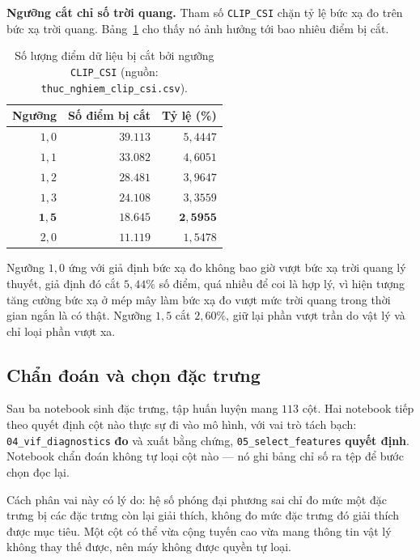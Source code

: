 \textbf{Ngưỡng cắt chỉ số trời quang.} Tham số \texttt{CLIP\_CSI} chặn tỷ lệ bức xạ đo trên bức xạ
trời quang. Bảng~\ref{tab:clip_csi} cho thấy nó ảnh hưởng tới bao nhiêu điểm bị cắt.

\begin{table}[htbp]
\centering
\caption{Số lượng điểm dữ liệu bị cắt bởi ngưỡng \texttt{CLIP\_CSI} (nguồn: \texttt{thuc\_nghiem\_clip\_csi.csv}).}
\label{tab:clip_csi}
\small
\begin{tabular}{r r r}
\toprule
\textbf{Ngưỡng} & \textbf{Số điểm bị cắt} & \textbf{Tỷ lệ (\%)} \\
\midrule
$1{,}0$ & $39.113$ & $5{,}4447$ \\
$1{,}1$ & $33.082$ & $4{,}6051$ \\
$1{,}2$ & $28.481$ & $3{,}9647$ \\
$1{,}3$ & $24.108$ & $3{,}3559$ \\
$\mathbf{1{,}5}$ & $\mathbf{18.645}$ & $\mathbf{2{,}5955}$ \\
$2{,}0$ & $11.119$ & $1{,}5478$ \\
\bottomrule
\end{tabular}
\end{table}

Ngưỡng $1{,}0$ ứng với giả định bức xạ đo không bao giờ vượt bức xạ trời quang lý thuyết,
giả định đó cắt $5{,}44\%$ số điểm, quá nhiều để coi là hợp lý, vì hiện tượng tăng cường bức
xạ ở mép mây làm bức xạ đo vượt mức trời quang trong thời gian ngắn là có thật. Ngưỡng
$1{,}5$ cắt $2{,}60\%$, giữ lại phần vượt trần do vật lý và chỉ loại phần vượt xa.

\FloatBarrier
\subsection{Chẩn đoán và chọn đặc trưng}

Sau ba notebook sinh đặc trưng, tập huấn luyện mang $113$ cột. Hai notebook tiếp theo quyết định
cột nào thực sự đi vào mô hình, với vai trò tách bạch: \texttt{04\_vif\_diagnostics} \textbf{đo} và
xuất bằng chứng, \texttt{05\_select\_features} \textbf{quyết định}. Notebook chẩn đoán không tự loại
cột nào --- nó ghi bảng chỉ số ra tệp để bước chọn đọc lại.

Cách phân vai này có lý do: hệ số phóng đại phương sai chỉ đo mức một đặc trưng bị các đặc trưng
còn lại giải thích, không đo mức đặc trưng đó giải thích được mục tiêu. Một cột có thể vừa cộng
tuyến cao vừa mang thông tin vật lý không thay thế được, nên máy không được quyền tự loại.

